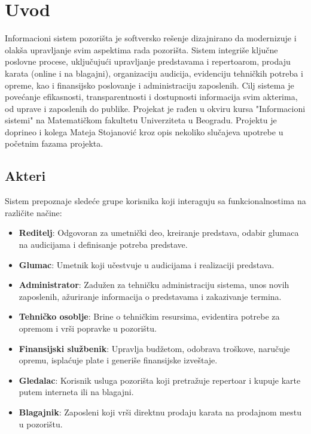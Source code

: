 \section{Uvod}
Informacioni sistem pozorišta je softversko rešenje dizajnirano da modernizuje i olakša upravljanje svim aspektima rada pozorišta. Sistem integriše ključne poslovne procese, uključujući upravljanje predstavama i repertoarom, prodaju karata (online i na blagajni), organizaciju audicija, evidenciju tehničkih potreba i opreme, kao i finansijsko poslovanje i administraciju zaposlenih. Cilj sistema je povećanje efikasnosti, transparentnosti i dostupnosti informacija svim akterima, od uprave i zaposlenih do publike. Projekat je rađen u okviru kursa "Informacioni sistemi" na Matematičkom fakultetu Univerziteta u Beogradu. Projektu je doprineo i kolega Mateja Stojanović kroz opis nekoliko slučajeva upotrebe u početnim fazama projekta.

\subsection{Akteri}
Sistem prepoznaje sledeće grupe korisnika koji interaguju sa funkcionalnostima na različite načine:

\begin{itemize}
    \item \textbf{Reditelj}: Odgovoran za umetnički deo, kreiranje predstava, odabir glumaca na audicijama i definisanje potreba predstave.
    \item \textbf{Glumac}: Umetnik koji učestvuje u audicijama i realizaciji predstava.
    \item \textbf{Administrator}: Zadužen za tehničku administraciju sistema, unos novih zaposlenih, ažuriranje informacija o predstavama i zakazivanje termina.
    \item \textbf{Tehničko osoblje}: Brine o tehničkim resursima, evidentira potrebe za opremom i vrši popravke u pozorištu.
    \item \textbf{Finansijski službenik}: Upravlja budžetom, odobrava troškove, naručuje opremu, isplaćuje plate i generiše finansijske izveštaje.
    \item \textbf{Gledalac}: Korisnik usluga pozorišta koji pretražuje repertoar i kupuje karte putem interneta ili na blagajni.
    \item \textbf{Blagajnik}: Zaposleni koji vrši direktnu prodaju karata na prodajnom mestu u pozorištu.
\end{itemize}

